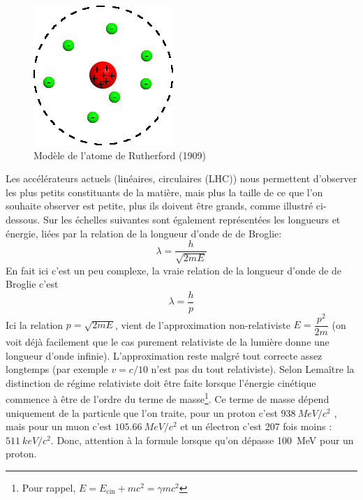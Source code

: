 \begin{figure}[ht]
    \centering
    \includegraphics[scale=0.65]{Images1/modelerutherford.png}
    \caption{Modèle de l'atome de Rutherford (1909)}
    \label{fig:modele_rutherford}
\end{figure}

Les accélérateurs actuels (linéaires, circulaires (LHC)) nous permettent d'observer les plus petits constituants de la matière, mais plus la taille de ce que l'on souhaite observer est petite, plus ils doivent être grands, comme illustré ci-dessous. Sur les échelles suivantes sont également représentées les longueurs et énergie, liées par la relation de la longueur d'onde de de Broglie:
\[ \lambda=\dfrac{h}{\sqrt{2mE}} \]
En fait ici c'est un peu complexe, la vraie relation de la longueur d'onde de de Broglie c'est
\[\lambda=\dfrac{h}{p}\]
Ici la relation $p = \sqrt{2mE}$, vient de l'approximation non-relativiste $E = \dfrac{p^{2}}{2m}$ (on voit déjà facilement que le cas purement relativiste de la lumière donne une longueur d'onde infinie). L'approximation reste malgré tout correcte assez longtemps (par exemple $v = c/10$ n'est pas du tout relativiste). Selon Lemaître la distinction de régime relativiste doit être faite lorsque l'énergie cinétique commence à être de l'ordre du terme de masse\footnote{Pour rappel, $E = E_\text{cin} + mc^2 = \gamma mc^2$}. Ce terme de masse dépend uniquement de la particule que l'on traite, pour un proton c'est $\SI{938}{MeV}/c^2$ , mais pour un muon c'est $\SI{105.66}{MeV}/c^2$ et un électron c'est 207 fois moins : $\SI{511}{keV}/c^2$. Donc, attention à la formule lorsque qu'on dépasse \SI{100}{MeV} pour un proton.

